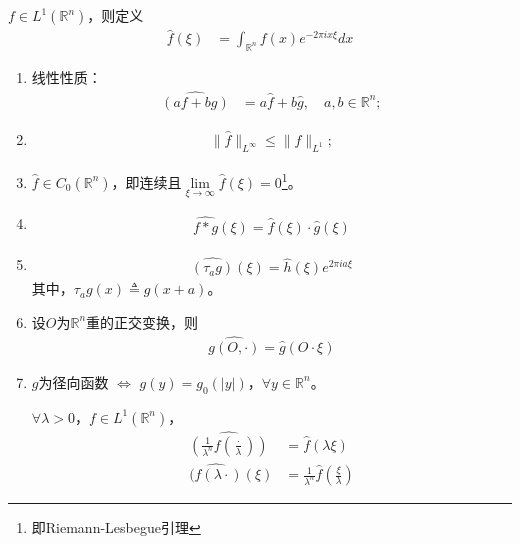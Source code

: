 \begin{definition}
    $f\in L^1(\mathbb{R}^n)$，则定义
    \begin{align*}
        \hat{f}(\xi) &= \int_{\mathbb{R}^n} f(x) e^{-2\pi i x \xi} dx
    \end{align*}
\end{definition}

\begin{proposition}
    \begin{enumerate}[leftmargin=1cm, label=\arabic*]
        \item 线性性质：
        \begin{align*}
            \widehat{(af + bg)} &= a\hat{f} + b\hat{g}, \quad a,b\in\mathbb{R}^n ;
        \end{align*}
        \item 
        \begin{align*}
            \| \hat{f} \|_{L^{\infty}} \leqslant \|f\|_{L^1};
        \end{align*}

        \item $\hat{f} \in C_0(\mathbb{R}^n)$，即连续且$\lim\limits_{\xi\to\infty} \hat{f}(\xi) = 0$\footnote{即Riemann-Lesbegue引理}。

        \item 
        \begin{align*}
            \widehat{f*g}(\xi) = \widehat{f}(\xi) \cdot \widehat{g}(\xi)
        \end{align*}

        \item 
        \begin{align*}
            \widehat{(\tau_a g)} (\xi) = \widehat{h}(\xi) e^{2\pi i a \xi}
        \end{align*}
        其中，$\tau_a g(x) \triangleq g(x+a)$。

        \item 设$O$为$\mathbb{R}^n$重的正交变换，则
        \begin{align*}
            \widehat{g(O,\cdot)} = \widehat{g}(O\cdot \xi)
        \end{align*}

        \item $g$为径向函数 $\Longleftrightarrow$ $g(y) = g_0(|y|)$，$\forall y\in\mathbb{R}^n$。
        
        $\forall \lambda > 0$，$f\in L^1(\mathbb{R}^n)$，
        \begin{align*}
            \widehat{\left(\frac{1}{\lambda^n} f\left(\frac{\cdot}{\lambda} \right) \right)} &= \hat{f}(\lambda\xi)  \\
            \widehat{(f(\lambda\cdot)}(\xi) & = \frac{1}{\lambda^n} \hat{f}\left(\frac{\xi}{\lambda}\right)
        \end{align*}


\end{enumerate}
\end{proposition}
